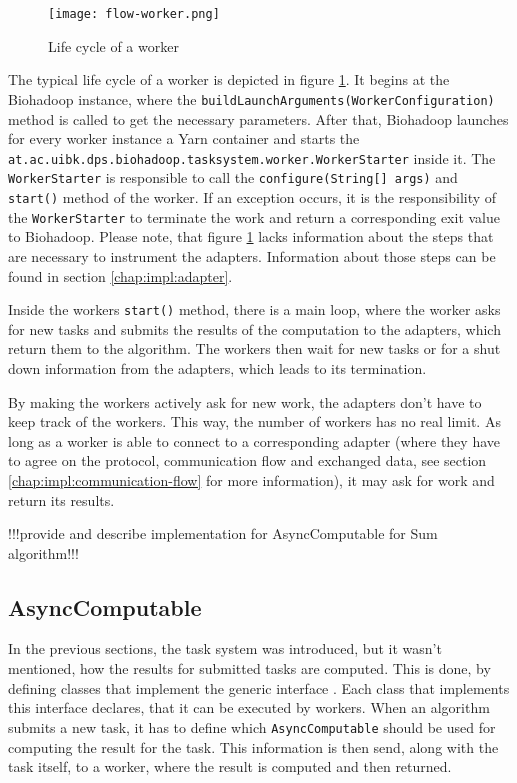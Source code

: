   \begin{figure}[ht!]
    \centering
    \texttt{[image: flow-worker.png]}
    \caption{Life cycle of a worker}
    \label{fig:flow-worker}
  \end{figure}
  
  The typical life cycle of a worker is depicted in figure \ref{fig:flow-worker}. It begins at the Biohadoop instance, where the \texttt{buildLaunchArguments(\newline WorkerConfiguration)} method is called to get the necessary parameters. After that, Biohadoop launches for every worker instance a Yarn container and starts the \texttt{at.ac.uibk.dps.biohadoop.tasksystem.worker.WorkerStarter} inside it. The \texttt{WorkerStarter} is responsible to call the \texttt{configure(String[] args)} and \texttt{start()} method of the worker. If an exception occurs, it is the responsibility of the \texttt{WorkerStarter} to terminate the work and return a corresponding exit value to Biohadoop. Please note, that figure \ref{fig:flow-worker} lacks information about the steps that are necessary to instrument the adapters. Information about those steps can be found in section \ref{chap:impl:adapter}.
  
  Inside the workers \texttt{start()} method, there is a main loop, where the worker asks for new tasks and submits the results of the computation to the adapters, which return them to the algorithm. The workers then wait for new tasks or for a shut down information from the adapters, which leads to its termination.

  By making the workers actively ask for new work, the adapters don't have to keep track of the workers. This way, the number of workers has no real limit. As long as a worker is able to connect to a corresponding adapter (where they have to agree on the protocol, communication flow and exchanged data, see section \ref{chap:impl:communication-flow} for more information), it may ask for work and return its results.
  
  !!!provide and describe implementation for AsyncComputable for Sum algorithm!!!

  \subsection{AsyncComputable}
  \label{chap:impl:async-computable}
  In the previous sections, the task system was introduced, but it wasn't mentioned, how the results for submitted tasks are computed. This is done, by defining classes that implement the generic interface . Each class that implements this interface declares, that it can be executed by workers. When an algorithm submits a new task, it has to define which \texttt{AsyncComputable} should be used for computing the result for the task. This information is then send, along with the task itself, to a worker, where the result is computed and then returned.
  

